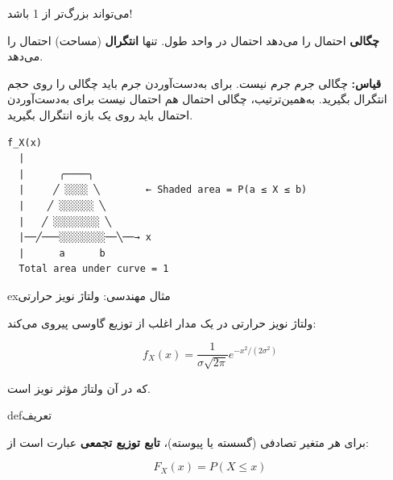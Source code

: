 
\begin{PSquote}

 می‌تواند بزرگ‌تر از 1 باشد!

\end{PSquote}

 \textbf{چگالی} احتمال را می‌دهد  احتمال در واحد طول. تنها \textbf{انتگرال} (مساحت) احتمال را می‌دهد.

\textbf{قیاس:} چگالی جرم  جرم نیست. برای به‌دست‌آوردن جرم باید چگالی را روی حجم انتگرال بگیرید. به‌همین‌ترتیب، چگالی احتمال هم احتمال نیست  برای به‌دست‌آوردن احتمال باید روی یک بازه انتگرال بگیرید.



\begin{PSplaincode}
\begin{Verbatim}
f_X(x)
  |
  |      ╭────╮
  |     ╱ ░░░░ ╲        ← Shaded area = P(a ≤ X ≤ b)
  |    ╱ ░░░░░░ ╲
  |   ╱ ░░░░░░░░ ╲
  |──╱───░░░░░░░░──╲──→ x
  |      a      b
  Total area under curve = 1
\end{Verbatim}
\end{PSplaincode}

\begin{PSbox}[unbreakable]{ex}{مثال مهندسی: ولتاژ نویز حرارتی}

ولتاژ نویز حرارتی در یک مدار اغلب از توزیع گاوسی پیروی می‌کند:

\[f_X(x) = \frac{1}{\sigma\sqrt{2\pi}} e^{-x^2/(2\sigma^2)}\]

که در آن \lr{\ensuremath{\sigma}} ولتاژ مؤثر  نویز است.


\end{PSbox}


\begin{PSbox}[unbreakable]{def}{تعریف}

برای هر متغیر تصادفی  (گسسته یا پیوسته)، \textbf{تابع توزیع تجمعی} عبارت است از:

\[F_X(x) = P(X \leq x)\]

\end{PSbox}


